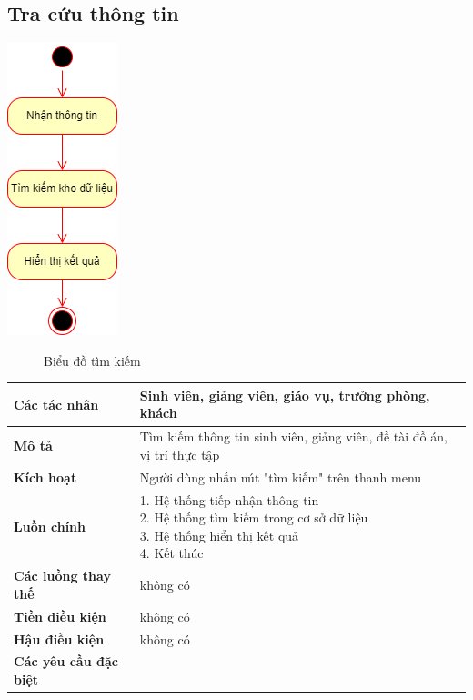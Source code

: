 \subsection{Tra cứu thông tin}
\begin{center}
	\includegraphics[width=.3\textwidth]{../drawio/activity/search_info.png}
	\begin{figure}[h]
		\centering
		\caption{Biểu đồ tìm kiếm}
	\end{figure}
\end{center}
\begin{tabular}{|l|l|}
	\hline
	\textbf{Các tác nhân}         & Sinh viên, giảng viên, giáo vụ, trưởng phòng, khách                     \\
	\hline
	\textbf{Mô tả}                & Tìm kiếm thông tin sinh viên, giảng viên, đề tài đồ án, vị trí thực tập \\
	\hline
	\textbf{Kích hoạt}            & Người dùng nhấn nút "tìm kiếm" trên thanh menu                          \\
	\hline
	\textbf{Luồn chính}           & \makecell[l]{1. Hệ thống tiếp nhận thông tin                            \\ 2. Hệ thống tìm kiếm trong cơ sở dữ liệu \\ 3. Hệ thống hiển thị kết quả \\ 4. Kết thúc} \\
	\hline
	\textbf{Các luồng thay thế}   & không có                                                                \\
	\hline
	\textbf{Tiền điều kiện}       & không có                                                                \\
	\hline
	\textbf{Hậu điều kiện}        & không có                                                                \\
	\hline
	\textbf{Các yêu cầu đặc biệt} &                                                                         \\
	\hline
\end{tabular}
